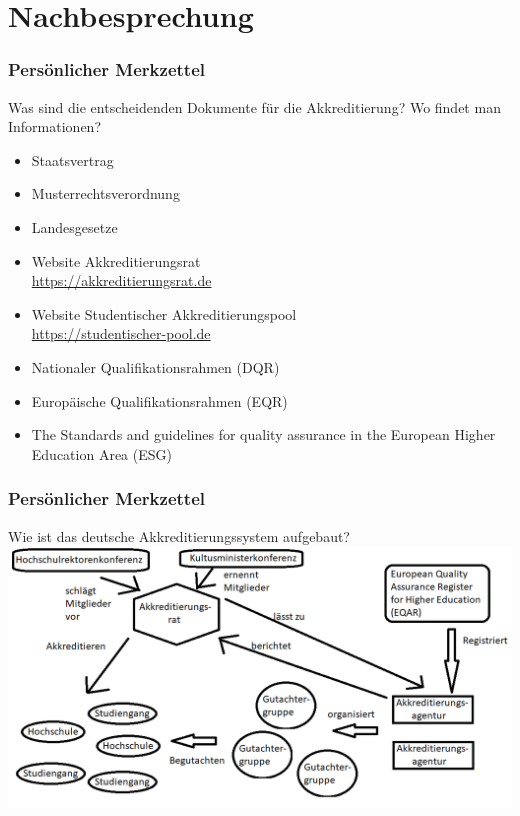 \documentclass{beamer}
\begin{document}
\section{Nachbesprechung}
\frame{\tableofcontents[currentsection]}
\begin{frame}
\frametitle{Persönlicher Merkzettel}
Was sind die entscheidenden Dokumente für die Akkreditierung? Wo findet man Informationen?
\begin{itemize}
\item Staatsvertrag
\item Musterrechtsverordnung
\item Landesgesetze
\end{itemize}
\pause
\begin{itemize}
\item Website Akkreditierungsrat\\\url{https://akkreditierungsrat.de}
\item Website Studentischer Akkreditierungspool\\\url{https://studentischer-pool.de}
\end{itemize}
\pause
\begin{itemize}
\item Nationaler Qualifikationsrahmen (DQR)
\item Europäische Qualifikationsrahmen (EQR)
\item The Standards and guidelines for quality assurance in the European Higher Education Area (ESG)
\end{itemize}
\end{frame}
\begin{frame}
\frametitle{Persönlicher Merkzettel}
Wie ist das deutsche Akkreditierungssystem aufgebaut?
\vspace{0.5cm}
  \includegraphics[width=1\textwidth]{Schaubild2.png}
\end{frame}
\end{document}
